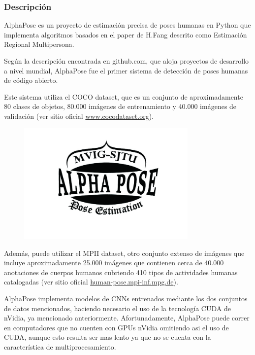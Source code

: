 \documentclass[a4paper,12pt,oneside,spanish]{book}
\begin{document}
\subsubsection{Descripción}
AlphaPose es un proyecto de estimación precisa de poses humanas en Python que implementa algoritmos basados en el paper de H.Fang \cite{alphapose1} descrito como Estimación Regional Multipersona.\par

Según la descripción encontrada en github.com, que aloja proyectos de desarrollo a nivel mundial, AlphaPose fue el primer sistema de detección de poses humanas de código abierto.\par

Este sistema utiliza el COCO dataset, que es un conjunto de aproximadamente 80 clases de objetos, 80.000 imágenes de entrenamiento y 40.000 imágenes de validación (ver sitio oficial \url{www.cocodataset.org}).\par

\begin{figure}[h!]
	\includegraphics[width=250pt]{Imagenes/alphapose.jpg}
	\centering	
	\label{fig:alphapose}
\end{figure}

Además, puede utilizar el MPII dataset, otro conjunto extenso de imágenes que incluye aproximadamente 25.000 imágenes que contienen cerca de 40.000 anotaciones de cuerpos humanos cubriendo 410 tipos de actividades humanas catalogadas (ver sitio oficial \url{human-pose.mpi-inf.mpg.de}).\par

AlphaPose implementa modelos de CNNs entrenados mediante los dos conjuntos de datos mencionados, haciendo necesario el uso de la tecnología CUDA de nVidia, ya mencionado anteriormente. Afortunadamente, AlphaPose puede correr en computadores que no cuenten con GPUs nVidia omitiendo asi el uso de CUDA, aunque esto resulta ser mas lento ya que no se cuenta con la característica de multiprocesamiento.\par
\end{document}
